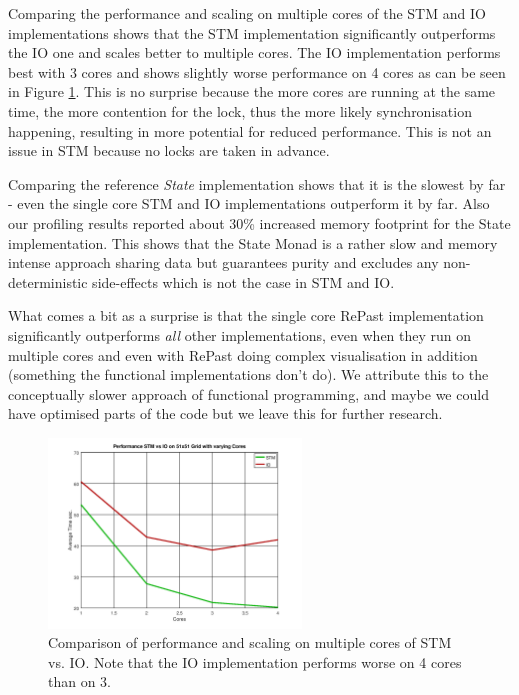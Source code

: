 Comparing the performance and scaling on multiple cores of the STM and IO implementations shows that the STM implementation significantly outperforms the IO one and scales better to multiple cores. The IO implementation performs best with 3 cores and shows slightly worse performance on 4 cores as can be seen in Figure \ref{fig:core_duration_stm_io}. This is no surprise because the more cores are running at the same time, the more contention for the lock, thus the more likely synchronisation happening, resulting in more potential for reduced performance. This is not an issue in STM because no locks are taken in advance. 

Comparing the reference \textit{State} implementation shows that it is the slowest by far - even the single core STM and IO implementations outperform it by far. Also our profiling results reported about 30\% increased memory footprint for the State implementation. This shows that the State Monad is a rather slow and memory intense approach sharing data but guarantees purity and excludes any non-deterministic side-effects which is not the case in STM and IO.

What comes a bit as a surprise is that the single core RePast implementation significantly outperforms \textit{all} other implementations, even when they run on multiple cores and even with RePast doing complex visualisation in addition (something the functional implementations don't do). We attribute this to the conceptually slower approach of functional programming, and maybe we could have optimised parts of the code but we leave this for further research.

\begin{figure}
	\centering
	\includegraphics[width=0.6\textwidth, angle=0]{./fig/core_duration_stm_io.png}
	\caption{Comparison of performance and scaling on multiple cores of STM vs. IO. Note that the IO implementation performs worse on 4 cores than on 3.}
	\label{fig:core_duration_stm_io}
\end{figure}

